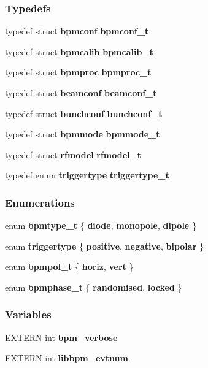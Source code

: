 \subsubsection*{Typedefs}
\begin{CompactItemize}
\item 
typedef struct {\bf bpmconf} {\bf bpmconf\_\-t}
\item 
typedef struct {\bf bpmcalib} {\bf bpmcalib\_\-t}
\item 
typedef struct {\bf bpmproc} {\bf bpmproc\_\-t}
\item 
typedef struct {\bf beamconf} {\bf beamconf\_\-t}
\item 
typedef struct {\bf bunchconf} {\bf bunchconf\_\-t}
\item 
typedef struct {\bf bpmmode} \textbf{bpmmode\_\-t}\label{group__interface_g2599c9e0c0e36819170e95dcdcdbdfc0}

\item 
typedef struct {\bf rfmodel} \textbf{rfmodel\_\-t}\label{group__interface_g98c565a46975280f28037fb092e24ec7}

\item 
typedef enum {\bf triggertype} \textbf{triggertype\_\-t}\label{group__interface_gbfc973a0ffff9e74bf9dcdad55ecd3ce}

\end{CompactItemize}
\subsubsection*{Enumerations}
\begin{CompactItemize}
\item 
enum {\bf bpmtype\_\-t} \{ {\bf diode}, 
{\bf monopole}, 
{\bf dipole}
 \}
\item 
enum {\bf triggertype} \{ {\bf positive}, 
{\bf negative}, 
{\bf bipolar}
 \}
\item 
enum {\bf bpmpol\_\-t} \{ {\bf horiz}, 
{\bf vert}
 \}
\item 
enum {\bf bpmphase\_\-t} \{ {\bf randomised}, 
{\bf locked}
 \}
\end{CompactItemize}
\subsubsection*{Variables}
\begin{CompactItemize}
\item 
EXTERN int {\bf bpm\_\-verbose}
\item 
EXTERN int {\bf libbpm\_\-evtnum}
\end{CompactItemize}
